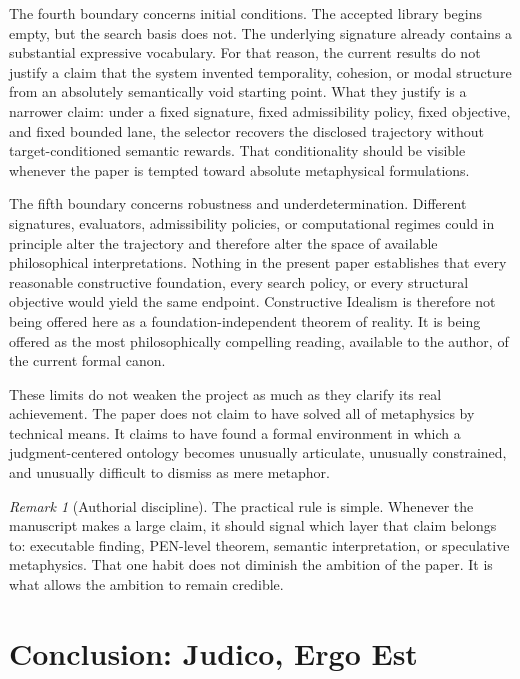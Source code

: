 \documentclass[11pt,a4paper]{article}
\theoremstyle{plain}
\theoremstyle{definition}
\theoremstyle{remark}
\newtheorem{remark}[theorem]{Remark}
\begin{document}
The fourth boundary concerns initial conditions.
The accepted library begins empty, but the search basis does not.
The underlying signature already contains a substantial expressive vocabulary.
For that reason, the current results do not justify a claim that the system invented temporality, cohesion, or modal structure from an absolutely semantically void starting point.
What they justify is a narrower claim: under a fixed signature, fixed admissibility policy, fixed objective, and fixed bounded lane, the selector recovers the disclosed trajectory without target-conditioned semantic rewards.
That conditionality should be visible whenever the paper is tempted toward absolute metaphysical formulations.

The fifth boundary concerns robustness and underdetermination.
Different signatures, evaluators, admissibility policies, or computational regimes could in principle alter the trajectory and therefore alter the space of available philosophical interpretations.
Nothing in the present paper establishes that every reasonable constructive foundation, every search policy, or every structural objective would yield the same endpoint.
Constructive Idealism is therefore not being offered here as a foundation-independent theorem of reality.
It is being offered as the most philosophically compelling reading, available to the author, of the current formal canon.

These limits do not weaken the project as much as they clarify its real achievement.
The paper does not claim to have solved all of metaphysics by technical means.
It claims to have found a formal environment in which a judgment-centered ontology becomes unusually articulate, unusually constrained, and unusually difficult to dismiss as mere metaphor.

\begin{remark}[Authorial discipline]
\label{rem:authorial-discipline}
The practical rule is simple.
Whenever the manuscript makes a large claim, it should signal which layer that claim belongs to: executable finding, PEN-level theorem, semantic interpretation, or speculative metaphysics.
That one habit does not diminish the ambition of the paper.
It is what allows the ambition to remain credible.
\end{remark}

\section{Conclusion: Judico, Ergo Est}
\label{sec:conclusion}
\end{document}
